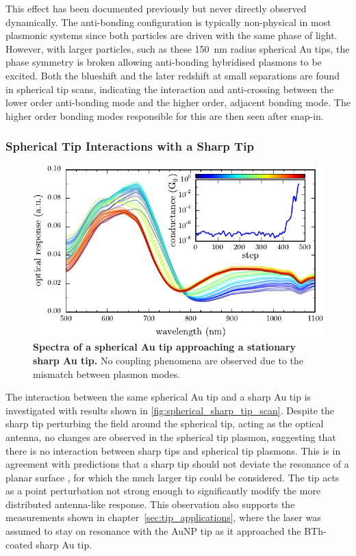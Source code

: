 \documentclass[a4paper]{article}
\begin{document}
This effect has been documented previously \cite{nordlander2004} but never directly observed dynamically. The anti-bonding configuration is typically non-physical in most plasmonic systems since both particles are driven with the same phase of light. However, with larger particles, such as these \SI{150}{nm} radius spherical Au tips, the phase symmetry is broken allowing anti-bonding hybridised plasmons to be excited. Both the blueshift and the later redshift at small separations are found in spherical tip scans, indicating the interaction and anti-crossing between the lower order anti-bonding mode and the higher order, adjacent bonding mode. The higher order bonding modes responsible for this are then seen after snap-in.

\subsubsection{Spherical Tip Interactions with a Sharp Tip}

\begin{figure}[b]
\centering
\includegraphics{figures/sharp-AuNP_tip_dimer}
\caption[Spectra of a spherical Au tip approaching a stationary sharp Au tip]{\textbf{Spectra of a spherical Au tip approaching a stationary sharp Au tip.} No coupling phenomena are observed due to the mismatch between plasmon modes.}
\label{fig:spherical_sharp_tip_scan}
\end{figure}

The interaction between the same spherical Au tip and a sharp Au tip is investigated with results shown in \autoref{fig:spherical_sharp_tip_scan}. Despite the sharp tip perturbing the field around the spherical tip, acting as the optical antenna, no changes are observed in the spherical tip plasmon, suggesting that there is no interaction between sharp tips and spherical tip plasmons. This is in agreement with predictions that a sharp tip should not deviate the resonance of a planar surface \cite{downes2006, hugall2012}, for which the much larger tip could be considered. The tip acts as a point perturbation not strong enough to significantly modify the more distributed antenna-like response. This observation also supports the measurements shown in chapter~\ref{sec:tip_applications}, where the laser was assumed to stay on resonance with the AuNP tip as it approached the BTh-coated sharp Au tip.
\end{document}
